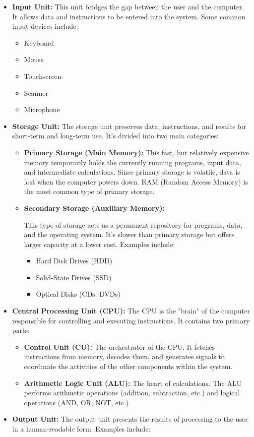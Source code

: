 \documentclass[
]{article}
\begin{document}
\begin{itemize}
\item
  \textbf{Input Unit:} This unit bridges the gap between the user and
  the computer. It allows data and instructions to be entered into the
  system. Some common input devices include:

  \begin{itemize}
  \item
    Keyboard
  \item
    Mouse
  \item
    Touchscreen
  \item
    Scanner
  \item
    Microphone
  \end{itemize}
\item
  \textbf{Storage Unit:} The storage unit preserves data, instructions,
  and results for short-term and long-term use. It's divided into two
  main categories:

  \begin{itemize}
  \item
    \textbf{Primary Storage (Main Memory):} This fast, but relatively
    expensive memory temporarily holds the currently running programs,
    input data, and intermediate calculations. Since primary storage is
    volatile, data is lost when the computer powers down. RAM (Random
    Access Memory) is the most common type of primary storage.
  \item
    \textbf{Secondary Storage (Auxiliary Memory):}

    This type of storage acts as a permanent repository for programs,
    data, and the operating system. It's slower than primary storage but
    offers larger capacity at a lower cost. Examples include:

    \begin{itemize}
    \item
      Hard Disk Drives (HDD)
    \item
      Solid-State Drives (SSD)
    \item
      Optical Disks (CDs, DVDs)
    \end{itemize}
  \end{itemize}
\item
  \textbf{Central Processing Unit (CPU):} The CPU is the "brain" of the
  computer responsible for controlling and executing instructions. It
  contains two primary parts:

  \begin{itemize}
  \item
    \textbf{Control Unit (CU):} The orchestrator of the CPU. It fetches
    instructions from memory, decodes them, and generates signals to
    coordinate the activities of the other components within the system.
  \item
    \textbf{Arithmetic Logic Unit (ALU):} The heart of calculations. The
    ALU performs arithmetic operations (addition, subtraction, etc.) and
    logical operations (AND, OR, NOT, etc.).
  \end{itemize}
\item
  \textbf{Output Unit:} The output unit presents the results of
  processing to the user in a human-readable form. Examples include:


\end{itemize}
\end{document}
